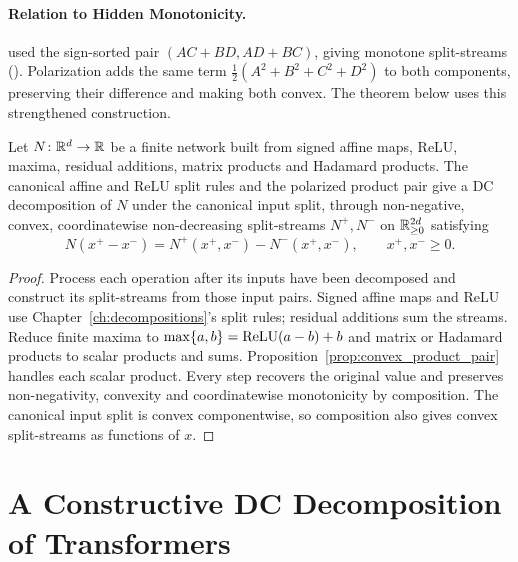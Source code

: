 \paragraph{Relation to Hidden Monotonicity.}\label{thm:multiplicative_split}
\textcite{hiddenMono} used the sign-sorted pair $(AC+BD,AD+BC)$, giving monotone split-streams (). Polarization adds the same term $\tfrac12(A^2+B^2+C^2+D^2)$ to both components, preserving their difference and making both convex. The theorem below uses this strengthened construction.

\begin{theoremenv}\label{thm:polarized_multiplicative_split}
Let $N\colon\mathbb{R}^d\to\mathbb{R}$ be a finite network built from signed affine maps, ReLU, maxima, residual additions, matrix products and Hadamard products. The canonical affine and ReLU split rules and the polarized product pair give a DC decomposition of $N$ under the canonical input split, through non-negative, convex, coordinatewise non-decreasing split-streams $N^+,N^-$ on $\mathbb{R}^{2d}_{\ge0}$ satisfying
\begin{equation}\label{eq:multiplicative_dc_recovery}
    N(x^+-x^-)=N^+(x^+,x^-)-N^-(x^+,x^-),\qquad x^+,x^-\ge0.
\end{equation}
\end{theoremenv}
\begin{proof}
Process each operation after its inputs have been decomposed and construct its split-streams from those input pairs. Signed affine maps and ReLU use Chapter~\ref{ch:decompositions}'s split rules; residual additions sum the streams. Reduce finite maxima to $\max\{a,b\}=\text{ReLU}(a-b)+b$ and matrix or Hadamard products to scalar products and sums. Proposition~\ref{prop:convex_product_pair} handles each scalar product. Every step recovers the original value and preserves non-negativity, convexity and coordinatewise monotonicity by composition. The canonical input split is convex componentwise, so composition also gives convex split-streams as functions of $x$.
\end{proof}

\section{A Constructive DC Decomposition of Transformers}\label{sec:transformer_dc}

